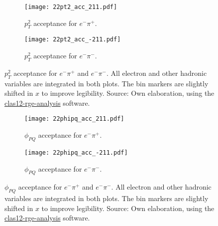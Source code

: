     \begin{figure}
        \centering
        \begin{subfigure}[b]{0.49\textwidth}
            \centering
            \texttt{[image: 22pt2\_acc\_211.pdf]}
            \caption{$p_T^2$ acceptance for $e^-\pi^+$.}
            \label{fig::14.22::pt2_acc_211}
        \end{subfigure}
        \hfill
        \begin{subfigure}[b]{0.49\textwidth}
            \centering
            \texttt{[image: 22pt2\_acc\_-211.pdf]}
            \caption{$p_T^2$ acceptance for $e^-\pi^-$.}
            \label{fig::14.22::pt2_acc_-211}
        \end{subfigure}
        \caption[$p_T^2$ acceptance.]{$p_T^2$ acceptance for $e^-\pi^+$ and $e^-\pi^-$.
        All electron and other hadronic variables are integrated in both plots.
        The bin markers are slightly shifted in $x$ to improve legibility.
        Source: Own elaboration, using the \href{https://github.com/bleaktwig/clas12-rge-analysis}{clas12-rge-analysis} software.}
        \label{fig::14.22::pt2_acc}
    \end{figure}

    \begin{figure}
        \centering
        \begin{subfigure}[b]{0.49\textwidth}
            \centering
            \texttt{[image: 22phipq\_acc\_211.pdf]}
            \caption{$\phi_{PQ}$ acceptance for $e^-\pi^+$.}
            \label{fig::14.22::phipq_acc_211}
        \end{subfigure}
        \hfill
        \begin{subfigure}[b]{0.49\textwidth}
            \centering
            \texttt{[image: 22phipq\_acc\_-211.pdf]}
            \caption{$\phi_{PQ}$ acceptance for $e^-\pi^-$.}
            \label{fig::14.22::phipq_acc_-211}
        \end{subfigure}
        \caption[$\phi_{PQ}$ acceptance.]{$\phi_{PQ}$ acceptance for $e^-\pi^+$ and $e^-\pi^-$.
        All electron and other hadronic variables are integrated in both plots.
        The bin markers are slightly shifted in $x$ to improve legibility.
        Source: Own elaboration, using the \href{https://github.com/bleaktwig/clas12-rge-analysis}{clas12-rge-analysis} software.}
        \label{fig::14.22::phipq_acc}
    \end{figure}
